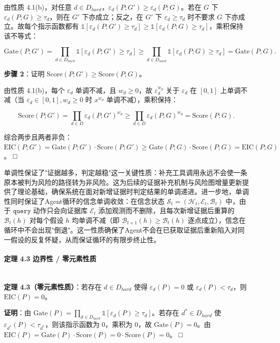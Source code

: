\documentclass[a4paper,12pt]{ctexart}
\begin{document}
由性质 4.1(b)，对任意 $d \in D_{hard}$，$\varepsilon_d(P; G') \geq \varepsilon_d(P; G)$。若在 $G$ 下 $\varepsilon_d(P;G) \geq \tau_d$，则在 $G'$ 下亦成立；反之，在 $G'$ 下 $\varepsilon_d \geq \tau_d$ 时不要求 $G$ 下亦成立。故每个指示函数都有 $\mathbb{1}[\varepsilon_d(P;G') \geq \tau_d] \geq \mathbb{1}[\varepsilon_d(P;G) \geq \tau_d]$，乘积保持该不等式：

\[
\text{Gate}(P; G') = \prod_{d \in D_{hard}} \mathbb{1}[\varepsilon_d(P;G') \geq \tau_d] \geq \prod_{d \in D_{hard}} \mathbb{1}[\varepsilon_d(P;G) \geq \tau_d] = \text{Gate}(P; G).
\]

\textbf{步骤 2}：证明 $\text{Score}(P; G') \geq \text{Score}(P; G)$。

由性质 4.1(b)，每个 $\varepsilon_d$ 单调不减，且 $w_d \geq 0$，故 $\varepsilon_d^{w_d}$ 关于 $\varepsilon_d$ 在 $[0,1]$ 上单调不减（当 $\varepsilon_d \in [0,1], w_d \geq 0$ 时 $x^{w_d}$ 单调不减），乘积保持：

\[
\text{Score}(P; G') = \prod_{d \in D} \varepsilon_d(P;G')^{w_d} \geq \prod_{d \in D} \varepsilon_d(P;G)^{w_d} = \text{Score}(P; G).
\]

综合两步且两者非负：$\text{EIC}(P; G') = \text{Gate}(P;G') \cdot \text{Score}(P;G') \geq \text{Gate}(P;G) \cdot \text{Score}(P;G) = \text{EIC}(P; G)$。 □

单调性保证了"证据越多，判定越稳"这一关键性质：补充工具调用永远不会使一条原本被判为风险的路径转为非风险。这为后续的证据补充机制与风险图增量更新提供了理论基础，确保系统在面对新增证据时判定结果的单调递进。进一步地，单调性同时保证了Agent循环的信念单调收敛：在信念状态 $\mathcal{S}_t = (\mathcal{H}_t, \mathcal{E}_t, \mathcal{B}_t)$ 中，由于 $\texttt{query}$ 动作只会向证据库 $\mathcal{E}_t$ 添加观测而不删除，且每次新增证据后重算的 $\mathcal{B}_t(h)$ 对每个假设 $h$ 均单调不减（即 $\mathcal{B}_{t+1}(h) \geq \mathcal{B}_t(h)$ 逐点成立），信念在循环中不会出现"倒退"。这一性质确保了Agent不会在已获取证据后重新陷入对同一假设的反复怀疑，从而保证循环的有限步终止性。

\paragraph{定理 4.3 边界性 / 零元素性质}\mbox{}\\

\textbf{定理 4.3（零元素性质）}：若存在 $d \in D_{hard}$ 使得 $\varepsilon_d(P) = 0$ 或 $\varepsilon_d(P) < \tau_d$，则 $\text{EIC}(P) = 0$。

\textbf{证明}：由 $\text{Gate}(P) = \prod_{d \in D_{hard}} \mathbb{1}[\varepsilon_d(P) \geq \tau_d]$。若存在 $d^* \in D_{hard}$ 使 $\varepsilon_{d^*}(P) < \tau_{d^*}$，则该指示函数为 0，乘积为 0，故 $\text{Gate}(P)=0$。由 $\text{EIC}(P) = \text{Gate}(P) \cdot \text{Score}(P) = 0 \cdot \text{Score}(P) = 0$。 □
\end{document}
